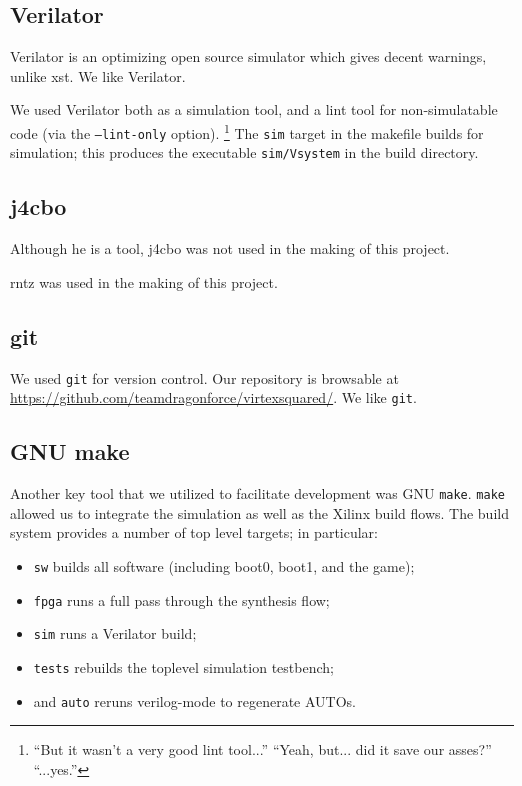\documentclass[10pt]{report}
\begin{document}
\subsection{Verilator}

Verilator is an optimizing open source simulator which gives decent
warnings, unlike xst. We like Verilator.

We used Verilator both as a simulation tool, and a lint tool for
non-simulatable code (via the \texttt{--lint-only} option).  \footnote{``But
it wasn't a very good lint tool...'' ``Yeah, but...  did it save our
asses?'' ``...yes.''} The \texttt{sim} target in the makefile builds for
simulation; this produces the executable \texttt{sim/Vsystem} in the build
directory.

\subsection{j4cbo}

Although he is a tool, j4cbo was not used in the making of this project.

rntz was used in the making of this project.

\subsection{git}

We used \texttt{git} for version control. Our repository is browsable at
\url{https://github.com/teamdragonforce/virtexsquared/}. We like \texttt{git}.

\subsection{GNU make}

\label{sec:build}

Another key tool that we utilized to facilitate development was GNU
\texttt{make}.  \texttt{make} allowed us to integrate the simulation as well
as the Xilinx build flows.  The build system provides a number of top level
targets; in particular:

\begin{itemize}
\item{\texttt{sw} builds all software (including boot0, boot1, and the game);}
\item{\texttt{fpga} runs a full pass through the synthesis flow;}
\item{\texttt{sim} runs a Verilator build;}
\item{\texttt{tests} rebuilds the toplevel simulation testbench;}
\item{and \texttt{auto} reruns verilog-mode to regenerate AUTOs.}
\end{itemize}
\end{document}
